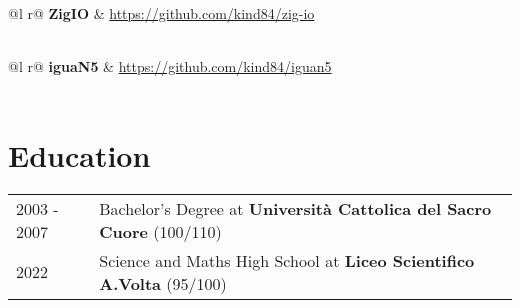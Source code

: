 \documentclass[a4paper,12pt]{article}
\begin{document}
\begin{tabularx}{\linewidth}{ @{}l r@{} }
\textbf{ZigIO} & \hfill \href{https://github.com/kind84/zig-io}{https://github.com/kind84/zig-io} \\[3.75pt]
  \\
\end{tabularx}

\begin{tabularx}{\linewidth}{ @{}l r@{} }
\textbf{iguaN5} & \hfill \href{https://github.com/kind84/iguan5}{https://github.com/kind84/iguan5} \\[3.75pt]
  \\
\end{tabularx}

\section{Education}
\begin{tabularx}{\linewidth}{@{}l X@{}}	
2003 - 2007 & Bachelor's Degree at \textbf{Università Cattolica del Sacro Cuore} \hfill (100/110) \\ 

2022 & Science and Maths High School at \textbf{Liceo Scientifico A.Volta} \hfill  (95/100) \\
\end{tabularx}

\end{document}
